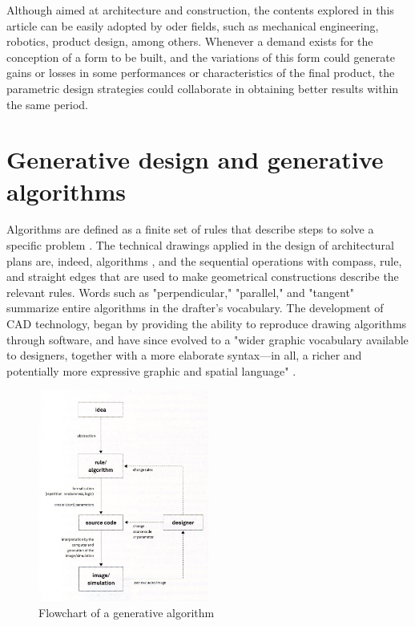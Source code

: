 \documentclass[preprint,12pt,3p]{elsarticle}
\begin{document}
Although aimed at architecture and construction, the contents explored in this article can be easily adopted by oder fields, such as mechanical engineering, robotics, product design, among others. Whenever a demand exists for the conception of a form to be built, and the variations of this form could generate gains or losses in some performances or characteristics of the final product, the parametric design strategies could collaborate in obtaining better results within the same period. 


\section{Generative design and generative algorithms}
\label{generaalgor}

Algorithms are defined as a finite set of rules that describe steps to solve a specific problem \cite{knuth1997art}. The technical drawings applied in the design of architectural plans are, indeed, algorithms \cite[chap. 3]{terzidis2006algorithmic}, and the sequential operations with compass, rule, and straight edges that are used to make geometrical constructions describe the relevant rules. Words such as "perpendicular," "parallel," and "tangent" summarize entire algorithms in the drafter's vocabulary. The development of CAD technology, began by providing the ability to reproduce drawing algorithms through software, and have since evolved to a "wider graphic vocabulary available to designers, together with a more elaborate syntax---in all, a richer and potentially more expressive graphic and spatial language" \cite[chap. 15]{mitchell2008}.

\begin{figure}[!h]
\begin{center}
\includegraphics[width=0.5\textwidth]{fluxogramametodologia.jpg}
\caption{Flowchart of a generative algorithm}
\label{figura:fluxogramametodologia}
\end{center}
\end{figure}
\end{document}
